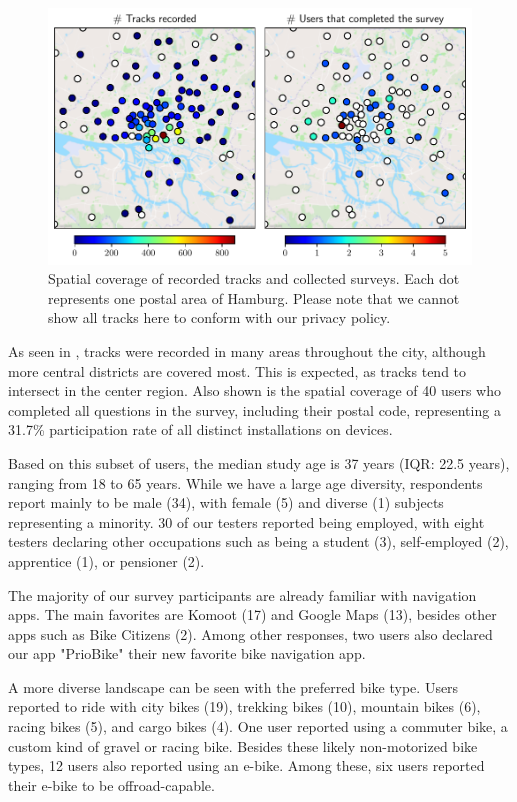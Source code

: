 \begin{figure}[t]
\caption{Spatial coverage of recorded tracks and collected surveys. Each dot represents one postal area of Hamburg. Please note that we cannot show all tracks here to conform with our privacy policy.}\label{fig:app-spatial-distribution}
\includegraphics[width=\linewidth]{images/app-spatial-distribution.pdf}
\end{figure}

As seen in , tracks were recorded in many areas throughout the city, although more central districts are covered most. This is expected, as tracks tend to intersect in the center region. Also shown is the spatial coverage of 40 users who completed all questions in the survey, including their postal code, representing a 31.7\% participation rate of all distinct installations on devices.

Based on this subset of users, the median study age is 37 years (IQR: 22.5 years), ranging from 18 to 65 years. While we have a large age diversity, respondents report mainly to be male (34), with female (5) and diverse (1) subjects representing a minority. 30 of our testers reported being employed, with eight testers declaring other occupations such as being a student (3), self-employed (2), apprentice (1), or pensioner (2).

The majority of our survey participants are already familiar with navigation apps. The main favorites are Komoot (17) and Google Maps (13), besides other apps such as Bike Citizens (2). Among other responses, two users also declared our app "PrioBike" their new favorite bike navigation app. 

A more diverse landscape can be seen with the preferred bike type. Users reported to ride with city bikes (19), trekking bikes (10), mountain bikes (6), racing bikes (5), and cargo bikes (4). One user reported using a commuter bike, a custom kind of gravel or racing bike. Besides these likely non-motorized bike types, 12 users also reported using an e-bike. Among these, six users reported their e-bike to be offroad-capable. 


